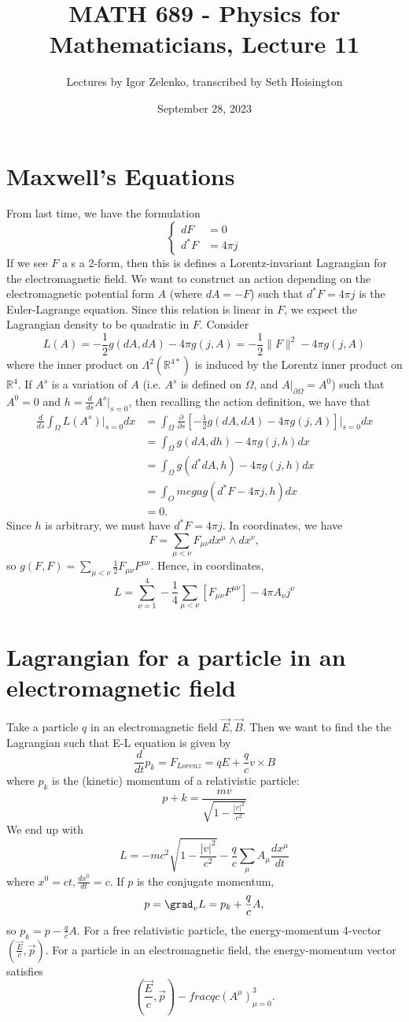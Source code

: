 \documentclass{article}
\title{MATH 689 - Physics for Mathematicians, Lecture 11}
\author{Lectures by Igor Zelenko, transcribed by Seth Hoisington}
\date{September 28, 2023}
\newcommand{\R}{\mathbb R}
\newcommand{\nl}{\newline\newline\noindent}
\newcommand{\pd}[1]{\frac{\partial}{\partial #1}}
\begin{document}
\maketitle

\section{Maxwell's Equations}
From last time, we have the formulation
\[\left\{\begin{aligned}
    dF &= 0\\ 
    d^*F &= 4\pi j 
\end{aligned}\right.\]
If we see $F$ a s a 2-form, then this is defines a Lorentz-invariant Lagrangian for the electromagnetic field. We want to construct an action depending on the electromagnetic potential form $A$ (where $dA = -F$) such that $d^*F = 4\pi j$ is the Euler-Lagrange equation.
\nl
Since this relation is linear in $F$, we expect the Lagrangian density to be quadratic in $F$. Consider
\[L(A) = -\frac{1}{2}g(dA,dA) - 4\pi g(j,A) = -\frac{1}{2}\|F\|^2  - 4\pi g(j,A)\]
where the inner product on $\Lambda^2(\R^{4*})$ is induced by the Lorentz inner product on $\R^4$. If $A^s$ is a variation of $A$ (i.e. $A^s$ is defined on $\Omega$, and $A|_{\partial\Omega} = A^0$) such that $A^0 = 0$ and $h = \frac{d}{ds}A^s\big|_{s=0}$, then recalling the action definition, we have that
\begin{align*}
    \frac{d}{ds}\int_\Omega L(A^s)\bigg|_{s=0}dx &= \int_\Omega\pd{s}\left[ -\frac{1}{2}g(dA,dA) - 4\pi g(j,A)\right]\bigg|_{s=0}dx\\
    &=\int_\Omega g(dA,dh) - 4\pi g(j,h)dx\\
    &= \int_\Omega g(d^*dA,h) - 4\pi g(j,h)dx \\
    &=\int_Omega g\left(d^*F - 4\pi j, h\right)dx\\
    &= 0.
\end{align*}
Since $h$ is arbitrary, we must have $d^*F = 4\pi j$. In coordinates, we have
\[F = \sum_{\mu<\nu} F_{\mu\nu} dx^\mu\wedge dx^\nu,\]
so $g(F,F) = \sum_{\mu<\nu}\frac{1}{2}F_{\mu\nu}F^{\mu\nu}$. Hence, in coordinates,
\[L =\sum_{\nu = 1}^4 -\frac{1}{4}\sum_{\mu<\nu}\left[F_{\mu\nu}F^{\mu\nu}\right] - 4\pi A_\nu j^\nu\]
\section{Lagrangian for a particle in an electromagnetic field}
Take a particle $q$ in an electromagnetic field $\vec E, \vec B$. Then we want to find the the Lagrangian such that E-L equation is given by 
\[\frac{d}{dt}p_k = F_{Lorenz} = qE + \frac{q}{c}v\times B\]
where $p_k$ is the (kinetic) momentum of a relativistic particle:
\[p+k = \frac{mv}{\sqrt{1-\frac{|v|^2}{c^2}}}\]
We end up with
\[L = -mc^2 \sqrt{1-\frac{|v|^2}{c^2}} - \frac{q}{c}\sum_\mu A_\mu \frac{dx^\mu}{dt}\]
where $x^0 = ct, \frac{dx^0}{dt} = c$. If $p$ is the conjugate momentum, 
\[p = \grad_vL = p_k + \frac{q}{c}A,\]
so $p_k = p - \frac{q}{c}A$. For a free relativistic particle, the energy-momentum 4-vector $(\frac{\vec E}{c},\vec p)$. For a particle in an electromagnetic field, the energy-momentum vector satisfies
\[(\frac{\vec E}{c},\vec p) - frac{q}{c}(A^\mu)_{\mu = 0}^3.\]
\end{document}
